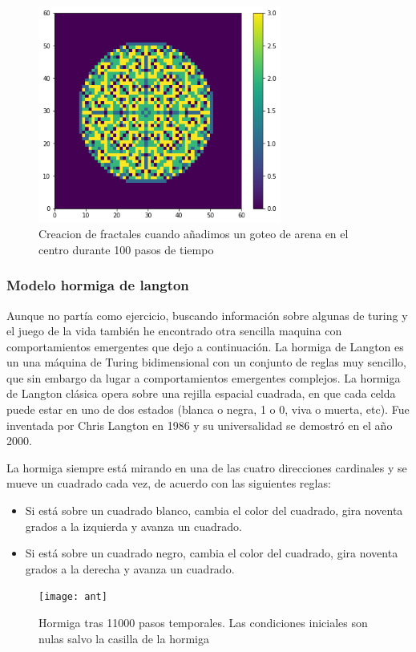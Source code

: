  \begin{figure}
 	\centering
 	\includegraphics[width=8cm]{pila_arena}
 	\caption{Creacion de fractales cuando añadimos un goteo de arena en el centro durante 100 pasos de tiempo }
 	\label{sand3}
 \end{figure}


    
\subsubsection{\large Modelo hormiga de langton}    
Aunque no partía como ejercicio, buscando información sobre algunas de turing y el juego de la vida también he encontrado otra sencilla maquina con comportamientos emergentes que dejo a continuación.
La hormiga de Langton es un una máquina de Turing bidimensional con un conjunto de reglas muy sencillo, que sin embargo da lugar a comportamientos emergentes complejos.
 La hormiga de Langton clásica opera sobre una rejilla espacial cuadrada, en que cada celda puede estar en uno de dos estados (blanca o negra, 1 o 0, viva o muerta, etc). Fue inventada por Chris Langton en 1986 y su universalidad se demostró en el año 2000.
 
 La hormiga siempre está mirando en una de las cuatro direcciones cardinales y se mueve un cuadrado cada vez, de acuerdo con las siguientes reglas:
 \begin{itemize}
 	\item Si está sobre un cuadrado blanco, cambia el color del cuadrado, gira noventa grados a la izquierda y avanza un cuadrado.
 	\item Si está sobre un cuadrado negro, cambia el color del cuadrado, gira noventa grados a la derecha y avanza un cuadrado.
 \end{itemize}
 
   \begin{figure}
   	\centering
   	\texttt{[image: ant]}
   	\caption{Hormiga tras 11000 pasos temporales. Las condiciones iniciales son nulas salvo la casilla de la hormiga }
   	\label{ant}
   \end{figure}
  



